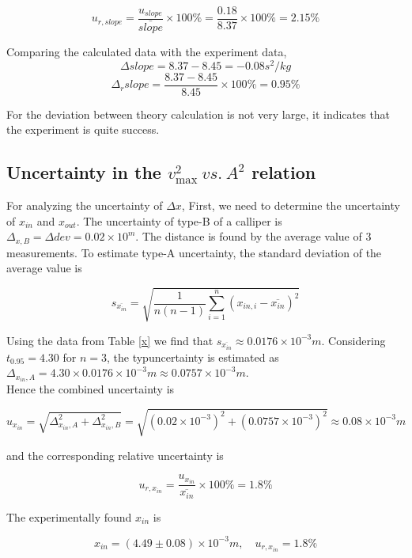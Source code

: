 $$ u_{r,slope} = \frac{u_{slope}}{\bar{slope}} \times 100 \%
               =\frac{0.18}{8.37} \times 100 \% = 2.15\% $$

Comparing the calculated data with the experiment data,
$$   \Delta slope = 8.37 - 8.45 = -0.08 s^2/kg        				   $$
$$   \Delta_r slope = \frac{ 8.37 - 8.45}{8.45} \times 100\% = 0.95 \%  $$

For the deviation between theory calculation is not very large, it indicates that the experiment is quite success.


\subsection{Uncertainty in the $v_{\max}^2\ vs.\ A^2$ relation}

For analyzing the uncertainty of $\Delta x$,
First, we need to determine the uncertainty of $x_{in}$ and $x_{out}$. The uncertainty of type-B of a calliper is $\Delta_{x,B}=\Delta{dev}=0.02\times10^m$. The distance is found by the average value of 3 measurements. To estimate  type-A uncertainty, the standard deviation of the average value is 

$$   s_{\overline{x_{in}}}=\sqrt{\frac{1}{n(n-1)}\sum_{i=1}^n(x_{in,i}-\overline{x_{in}})^2} $$

Using the data from Table \ref{x} we find that $s_{\overline{x_{in}}}\approx 0.0176\times10^{-3}m$. Considering $t_{0.95}=4.30$ for $n=3$, the typuncertainty is estimated as $\Delta_{x_{in},A}=4.30\times0.0176\times10^{-3}m\approx 0.0757\times10^{-3}m$.\\
Hence the combined uncertainty is

$$  u_{x_{in}}=\sqrt{\Delta_{x_{in},A}^2+\Delta_{x_{in},B}^2}=\sqrt{(0.02\times10^{-3})^2+(0.0757\times10^{-3})^2}\approx 0.08\times10^{-3}m$$

 and the corresponding relative uncertainty is 

$$  u_{r,x_{in}}=\frac{u_{x_{in}}}{\overline{x_{in}}}\times 100\%=1.8\%$$

The experimentally found $x_{in}$ is 

$$    x_{in}=(4.49\pm 0.08) \times10^{-3}m,\quad u_{r,x_{in}}=1.8\%$$

